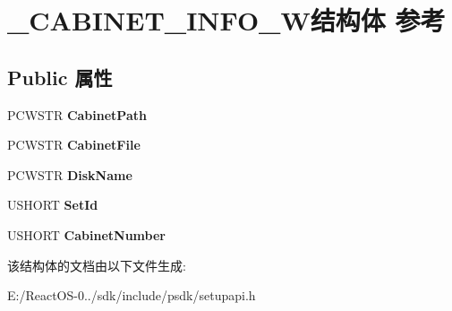\hypertarget{struct___c_a_b_i_n_e_t___i_n_f_o___w}{}\section{\+\_\+\+C\+A\+B\+I\+N\+E\+T\+\_\+\+I\+N\+F\+O\+\_\+\+W结构体 参考}
\label{struct___c_a_b_i_n_e_t___i_n_f_o___w}
\subsection*{Public 属性}
\begin{DoxyCompactItemize}
\item 
\mbox{\label{struct___c_a_b_i_n_e_t___i_n_f_o___w_a4ec1f9311381ab823bef922633d6b651}} 
P\+C\+W\+S\+TR {\bfseries Cabinet\+Path}
\item 
\mbox{\label{struct___c_a_b_i_n_e_t___i_n_f_o___w_ac27a2fbbbab7a10a2f12098dbc68d07d}} 
P\+C\+W\+S\+TR {\bfseries Cabinet\+File}
\item 
\mbox{\label{struct___c_a_b_i_n_e_t___i_n_f_o___w_ad50288ddd0aca4f5c3eeb2d7de79f3cc}} 
P\+C\+W\+S\+TR {\bfseries Disk\+Name}
\item 
\mbox{\label{struct___c_a_b_i_n_e_t___i_n_f_o___w_abc02fe78f100ddd52918df1f7db10ab7}} 
U\+S\+H\+O\+RT {\bfseries Set\+Id}
\item 
\mbox{\label{struct___c_a_b_i_n_e_t___i_n_f_o___w_a201f5e79d78289af1cd7cc127a0784fb}} 
U\+S\+H\+O\+RT {\bfseries Cabinet\+Number}
\end{DoxyCompactItemize}


该结构体的文档由以下文件生成\+:\begin{DoxyCompactItemize}
\item 
E\+:/\+React\+O\+S-\/0../sdk/include/psdk/setupapi.\+h\end{DoxyCompactItemize}

